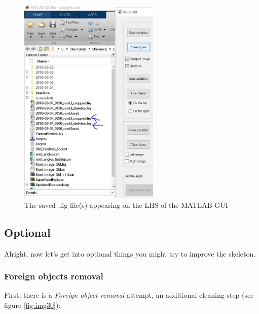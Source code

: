 \begin{figure}[H]
	\centering
	\includegraphics[width=0.6\textwidth]{../Figures/manual/save6.jpg}
	\caption{The saved .fig file(s) appearing on the LHS of the MATLAB GUI}
	\label{fig:img29}
\end{figure}


\subsection{Optional}

Alright, now let's get into optional things you might try to improve the skeleton.

\subsubsection{Foreign objects removal}

First, there is a \textit{Foreign object removal} attempt, an additional cleaning step (see figure \ref{fig:img30}):

